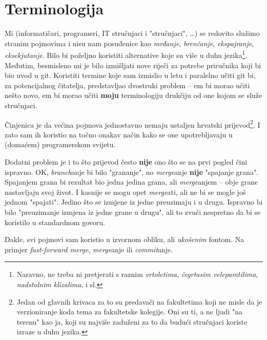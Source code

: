 \chapter*{Terminologija}

Mi (informatičari, programeri, IT stručnjaci i "stručnjaci", \dots) se redovito služimo stranim pojmovima i nisu nam posuđenice kao \emph{mrđanje}, \emph{brenčanje}, \emph{ekspajranje}, \emph{eksekjutanje}.
Bilo bi poželjno koristiti alternative koje su više u duhu jezika\footnote{Naravno, ne treba ni pretjerati s raznim \emph{vrtoletima}, \emph{čegrtasim velepamtilima}, \emph{nadstolnim klizalima}, i sl.}.
Međutim, besmisleno mi je bilo izmišljati nove riječi za potrebe priručnika koji bi bio uvod u git.
Koristiti termine koje sam izmislio u letu i paralelno učiti git bi, za potencijalnog čitatelja, predstavljao dvostruki problem -- em bi morao učiti nešto novo, em bi morao učiti \textbf{moju} terminologiju drukčiju od one kojom se služe stručnjaci.

Činjenica je da većina pojmova jednostavno nemaju ustaljen hrvatski prijevod\footnote{Jedan od glavnih krivaca za to su predavači na fakultetima koji ne misle da je verzioniranje koda tema za fakultetske kolegije. Oni su ti, a ne ljudi "na terenu" kao ja, koji su najviše zaduženi za to da budući stručnjaci koriste izraze u duhu jezika.}. 
I zato sam ih koristio na točno onakav način kako se one upotrebljavaju u (domaćem) programerskom svijetu.

Dodatni problem je i to što prijevod često \textbf{nije} ono što se na prvi pogled čini ispravno.
OK, \emph{branch}anje bi bilo "grananje", no \emph{merge}anje \textbf{nije} "spajanje grana". 
Spajanjem grana bi rezultat bio jedna jedina grana, ali \emph{merge}anjem -- obje grane nastavljaju svoj život. 
I kasnije se mogu opet \emph{merge}ati, ali ne bi se mogle još jednom "spajati".
Jedino što se izmjene iz jedne preuzimaju i u drugu. 
Ispravno bi bilo "preuzimanje izmjena iz jedne grane u drugu", ali to zvuči nespretno da bi se koristilo u standardnom govoru.

Dakle, svi pojmovi sam koristio u izvornom obliku, ali \emph{ukošenim} fontom. Na primjer \emph{fast-forward merge}, \emph{merge}anje ili \emph{commit}anje.


